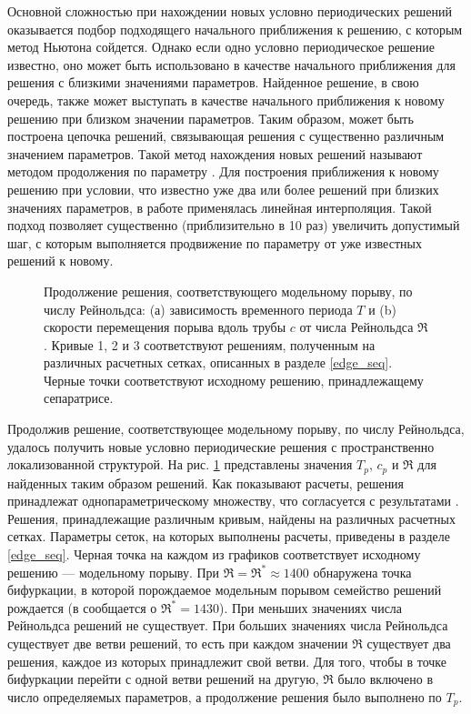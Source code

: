 Основной сложностью при нахождении новых условно периодических решений оказывается подбор подходящего начального приближения к решению, с которым метод Ньютона сойдется. Однако если одно условно периодическое решение известно, оно может быть использовано в качестве начального приближения для решения с близкими значениями параметров. Найденное решение, в свою очередь, также может выступать в качестве начального приближения к новому решению при близком значении параметров. Таким образом, может быть построена цепочка решений, связывающая решения с существенно различным значением параметров. Такой метод нахождения новых решений называют методом продолжения по параметру \cite{Viswanath2007, Dijkstra2014}. Для построения приближения к новому решению при условии, что известно уже два или более решений при близких значениях параметров, в работе применялась линейная интерполяция. Такой подход позволяет существенно (приблизительно в 10 раз) увеличить допустимый шаг, с которым выполняется продвижение по параметру от уже известных решений к новому. 

\begin{figure}
\caption{Продолжение решения, соответствующего модельному порыву, по числу Рейнольдса: (а) зависимость временного периода $T$ и (b) скорости перемещения порыва вдоль трубы $c$ от числа Рейнольдса $\Re$. Кривые 1, 2 и 3 соответствуют решениям, полученным на различных расчетных сетках, описанных в разделе \ref{edge_seq}. Черные точки соответствуют исходному решению, принадлежащему сепаратрисе.}
\label{local_contin_pic}
\end{figure}

Продолжив решение, соответствующее модельному порыву, по числу Рейнольдса, удалось получить новые условно периодические решения с пространственно локализованной структурой. На рис. \ref{local_contin_pic} представлены значения $T_p$, $c_p$ и $\Re$ для найденных таким образом решений. Как показывают расчеты, решения принадлежат однопараметрическому множеству, что согласуется с результатами \cite{Avila2013}. Решения, принадлежащие различным кривым, найдены на различных расчетных сетках. Параметры сеток, на которых выполнены расчеты, приведены в разделе \ref{edge_seq}. Черная точка на каждом из графиков соответствует исходному решению --- модельному порыву. При $\Re = \Re^* \approx 1400$ обнаружена точка бифуркации, в которой порождаемое модельным порывом семейство решений рождается (в \cite{Avila2013} сообщается о $\Re^* = 1430$). При меньших значениях числа Рейнольдса решений не существует. При больших значениях числа Рейнольдса существует две ветви решений, то есть при каждом значении $\Re$ существует два решения, каждое из которых принадлежит свой ветви. Для того, чтобы в точке бифуркации перейти с одной ветви решений на другую, $\Re$ было включено в число определяемых параметров, а продолжение решения было выполнено по $T_p$. 

